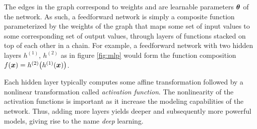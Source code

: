 The edges in the graph correspond to weights and are learnable parameters $\boldsymbol{\theta}$ of the network. As such, a feedforward network is simply a composite function parameterized by the weights of the graph that maps some set of input values to some corresponding set of output values, through layers of functions stacked on top of each other in a chain. For example, a feedforward network with two hidden layers $h^{(1)}$, $h^{(2)}$ as in figure \ref{fig:mlp} would form the function composition $f(\boldsymbol{x}) = h^{(2)}\big(h^{(1)}(\boldsymbol{x})\big)$.

Each hidden layer typically computes some affine transformation followed by a nonlinear transformation called \textit{activation function}. The nonlinearity of the activation functions is important as it increase the modeling capabilities of the network. Thus, adding more layers yields deeper and subsequently more powerful models, giving rise to the name \emph{deep} learning.


